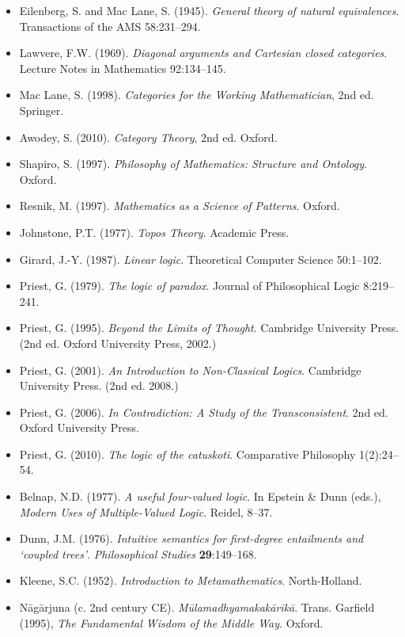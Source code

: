\documentclass[12pt,a4paper]{article}
\makeatletter
\renewcommand{\_}{\ig@origunderscore\discretionary{}{}{}}
\makeatother
\begin{document}
\begin{itemize}
 \item Eilenberg, S. and Mac Lane, S. (1945). \emph{General theory of natural equivalences}. Transactions of the AMS 58:231--294.
 \item Lawvere, F.W. (1969). \emph{Diagonal arguments and Cartesian closed categories}. Lecture Notes in Mathematics 92:134--145.
 \item Mac Lane, S. (1998). \emph{Categories for the Working Mathematician}, 2nd ed. Springer.
 \item Awodey, S. (2010). \emph{Category Theory}, 2nd ed. Oxford.
 \item Shapiro, S. (1997). \emph{Philosophy of Mathematics: Structure and Ontology}. Oxford.
 \item Resnik, M. (1997). \emph{Mathematics as a Science of Patterns}. Oxford.
 \item Johnstone, P.T. (1977). \emph{Topos Theory}. Academic Press.
 \item Girard, J.-Y. (1987). \emph{Linear logic}. Theoretical Computer Science 50:1--102.
 \item Priest, G. (1979). \emph{The logic of paradox}. Journal of Philosophical Logic 8:219--241.
 \item Priest, G. (1995). \emph{Beyond the Limits of Thought}. Cambridge University Press. (2nd ed. Oxford University Press, 2002.)
 \item Priest, G. (2001). \emph{An Introduction to Non-Classical Logics}. Cambridge University Press. (2nd ed. 2008.)
 \item Priest, G. (2006). \emph{In Contradiction: A Study of the Transconsistent}. 2nd ed. Oxford University Press.
 \item Priest, G. (2010). \emph{The logic of the catuskoti}. Comparative Philosophy 1(2):24--54.
 \item Belnap, N.D. (1977). \emph{A useful four-valued logic}. In Epstein \& Dunn (eds.),
 \emph{Modern Uses of Multiple-Valued Logic}. Reidel, 8--37.
 \item Dunn, J.M. (1976). \emph{Intuitive semantics for first-degree entailments and `coupled trees'}. \emph{Philosophical Studies} \textbf{29}:149--168.
 \item Kleene, S.C. (1952). \emph{Introduction to Metamathematics}. North-Holland.
 \item N\={a}g\={a}rjuna (c. 2nd century CE). \emph{M\={u}lamadhyamakak\={a}rik\={a}}. Trans. Garfield (1995),
\emph{The Fundamental Wisdom of the Middle Way}. Oxford.

\end{itemize}
\end{document}
